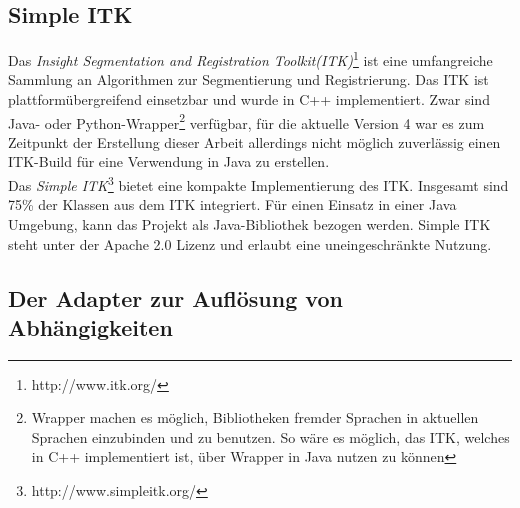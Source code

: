 \subsection{Simple ITK}
Das \textit{Insight Segmentation and Registration Toolkit(ITK)}\footnote{http://www.itk.org/} ist eine umfangreiche Sammlung an Algorithmen zur Segmentierung und Registrierung. Das ITK ist plattformübergreifend einsetzbar und wurde in C++ implementiert. Zwar sind Java- oder Python-Wrapper\footnote{Wrapper machen es möglich, Bibliotheken fremder Sprachen in aktuellen Sprachen einzubinden und zu benutzen. So wäre es möglich, das ITK, welches in C++ implementiert ist, über Wrapper in Java nutzen zu können} verfügbar, für die aktuelle Version 4 war es zum Zeitpunkt der Erstellung dieser Arbeit allerdings nicht möglich zuverlässig einen ITK-Build für eine Verwendung in Java zu erstellen.\\
Das \textit{Simple ITK}\footnote{http://www.simpleitk.org/} bietet eine kompakte Implementierung des ITK. Insgesamt sind 75\% der Klassen aus dem ITK integriert\cite{sitk:filter}. Für einen Einsatz in einer Java Umgebung, kann das Projekt als Java-Bibliothek bezogen werden. Simple ITK steht unter der Apache 2.0 Lizenz und erlaubt eine uneingeschränkte Nutzung.

\subsection{Der Adapter zur Auflösung von Abhängigkeiten} \label{adapter_dependencies}

